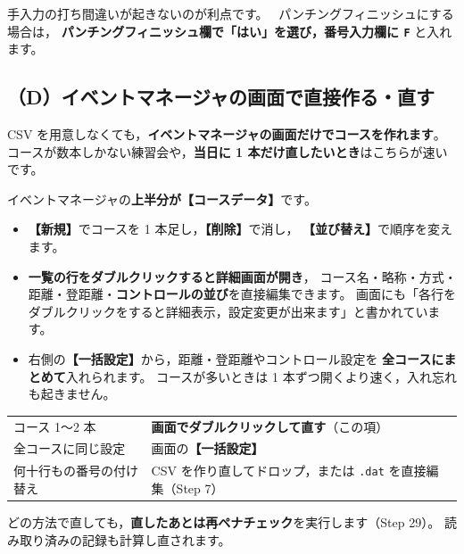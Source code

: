 手入力の打ち間違いが起きないのが利点です。
\tSI\ パンチングフィニッシュにする場合は，
\textbf{パンチングフィニッシュ欄で「はい」を選び，番号入力欄に \texttt{F}} と入れます。

\subsection*{（D）イベントマネージャの画面で直接作る・直す}

CSV を用意しなくても，\textbf{イベントマネージャの画面だけでコースを作れます}。
コースが数本しかない練習会や，\textbf{当日に 1 本だけ直したいとき}はこちらが速いです。

イベントマネージャの\textbf{上半分が【コースデータ】}です。\ver

\begin{itemize}
\item \textbf{【新規】}でコースを 1 本足し，\textbf{【削除】}で消し，
      \textbf{【並び替え】}で順序を変えます。
\item \textbf{一覧の行をダブルクリックすると詳細画面が開き}，
      コース名・略称・方式・距離・登距離・\textbf{コントロールの並び}を直接編集できます。
      画面にも「各行をダブルクリックをすると詳細表示，設定変更が出来ます」と書かれています。
\item 右側の\textbf{【一括設定】}から，距離・登距離やコントロール設定を
      \textbf{全コースにまとめて}入れられます。
      コースが多いときは 1 本ずつ開くより速く，入れ忘れも起きません。
\end{itemize}

\begin{Note}
\begin{center}
\small
\begin{tabular}{@{}P{46mm}P{96mm}@{}}
\toprule
{} &  \\
\midrule
コース 1〜2 本 & \textbf{画面でダブルクリックして直す}（この項） \\
全コースに同じ設定 & 画面の\textbf{【一括設定】} \\
何十行もの番号の付け替え & CSV を作り直してドロップ，または \texttt{.dat} を直接編集（Step 7） \\
\bottomrule
\end{tabular}
\end{center}
どの方法で直しても，\textbf{直したあとは再ペナチェック}を実行します（Step 29）。
読み取り済みの記録も計算し直されます。
\end{Note}


